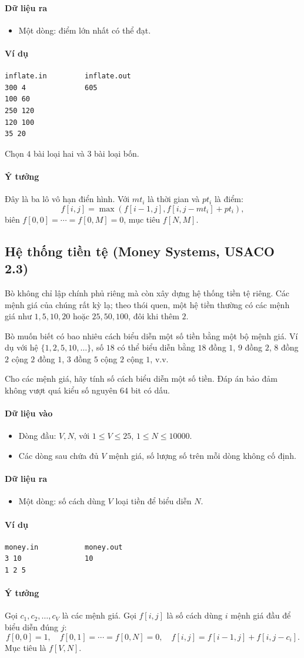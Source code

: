 \documentclass[11pt]{article}
\newcommand{\problem}[1]{\subsection{#1}}
\newcommand{\iosec}[1]{\paragraph{#1}}
\begin{document}
\iosec{Dữ liệu ra}
\begin{itemize}
  \item Một dòng: điểm lớn nhất có thể đạt.
\end{itemize}

\iosec{Ví dụ}
\begin{verbatim}
inflate.in         inflate.out
300 4              605
100 60
250 120
120 100
35 20
\end{verbatim}

Chọn \(4\) bài loại hai và \(3\) bài loại bốn.

\iosec{Ý tưởng}
Đây là ba lô vô hạn điển hình. Với \(mt_i\) là thời gian và \(pt_i\) là điểm:
\[
  f[i,j]=\max\left(f[i-1,j], f[i,j-mt_i]+pt_i\right),
\]
biên \(f[0,0]=\cdots=f[0,M]=0\), mục tiêu \(f[N,M]\).

\problem{Hệ thống tiền tệ (Money Systems, USACO 2.3)}

Bò không chỉ lập chính phủ riêng mà còn xây dựng hệ thống tiền tệ riêng. Các mệnh giá của chúng rất kỳ lạ; theo thói quen, một hệ tiền thường có các mệnh giá như \(1,5,10,20\) hoặc \(25,50,100\), đôi khi thêm \(2\).

Bò muốn biết có bao nhiêu cách biểu diễn một số tiền bằng một bộ mệnh giá. Ví dụ với hệ \(\{1,2,5,10,\ldots\}\), số \(18\) có thể biểu diễn bằng \(18\) đồng \(1\), \(9\) đồng \(2\), \(8\) đồng \(2\) cộng \(2\) đồng \(1\), \(3\) đồng \(5\) cộng \(2\) cộng \(1\), v.v.

Cho các mệnh giá, hãy tính số cách biểu diễn một số tiền. Đáp án bảo đảm không vượt quá kiểu số nguyên 64 bit có dấu.

\iosec{Dữ liệu vào}
\begin{itemize}
  \item Dòng đầu: \(V,N\), với \(1 \le V \le 25\), \(1 \le N \le 10000\).
  \item Các dòng sau chứa đủ \(V\) mệnh giá, số lượng số trên mỗi dòng không cố định.
\end{itemize}

\iosec{Dữ liệu ra}
\begin{itemize}
  \item Một dòng: số cách dùng \(V\) loại tiền để biểu diễn \(N\).
\end{itemize}

\iosec{Ví dụ}
\begin{verbatim}
money.in           money.out
3 10               10
1 2 5
\end{verbatim}

\iosec{Ý tưởng}
Gọi \(c_1,c_2,\ldots,c_V\) là các mệnh giá. Gọi \(f[i,j]\) là số cách dùng \(i\) mệnh giá đầu để biểu diễn đúng \(j\):
\[
  f[0,0]=1,\quad f[0,1]=\cdots=f[0,N]=0,\quad
  f[i,j]=f[i-1,j]+f[i,j-c_i].
\]
Mục tiêu là \(f[V,N]\).
\end{document}
